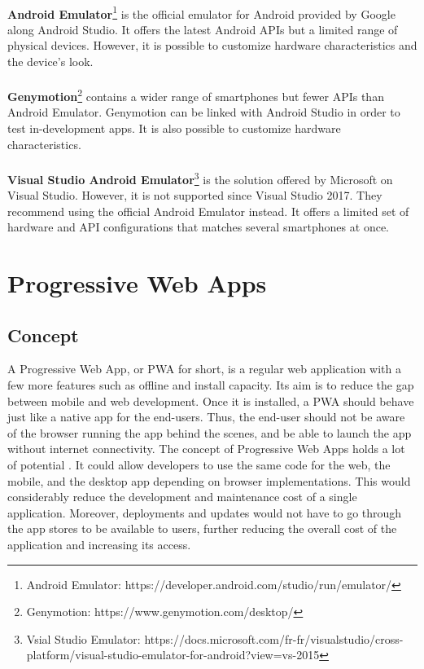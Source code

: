 \documentclass{kththesis}
\begin{document}
\paragraph{}
\textbf{Android Emulator}\footnote{Android Emulator: https://developer.android.com/studio/run/emulator/} is the official emulator for Android provided by Google along Android Studio. It offers the latest Android APIs but a limited range of physical devices. However, it is possible to customize hardware characteristics and the device's look.

\paragraph{}
\textbf{Genymotion}\footnote{Genymotion: https://www.genymotion.com/desktop/} contains a wider range of smartphones but fewer APIs than Android Emulator. Genymotion can be linked with Android Studio in order to test in-development apps. It is also possible to customize hardware characteristics.

\paragraph{}
\textbf{Visual Studio Android Emulator}\footnote{Vsial Studio Emulator: https://docs.microsoft.com/fr-fr/visualstudio/cross-platform/visual-studio-emulator-for-android?view=vs-2015} is the solution offered by Microsoft on Visual Studio. However, it is not supported since Visual Studio 2017. They recommend using the official Android Emulator instead. It offers a limited set of hardware and API configurations that matches several smartphones at once. 


\section{Progressive Web Apps}

\subsection{Concept}

A Progressive Web App, or PWA for short, is a regular web application with a few more features such as offline and install capacity. Its aim is to reduce the gap between mobile and web development. Once it is installed, a PWA should behave just like a native app for the end-users. Thus, the end-user should not be aware of the browser running the app behind the scenes, and be able to launch the app without internet connectivity. \newline
The concept of Progressive Web Apps holds a lot of potential \cite{PWApossibleUnifer}. It could allow developers to use the same code for the web, the mobile, and the desktop app depending on browser implementations. This would considerably reduce the development and maintenance cost of a single application. Moreover, deployments and updates would not have to go through the app stores to be available to users, further reducing the overall cost of the application and increasing its access.
\end{document}
